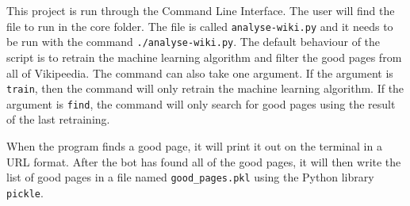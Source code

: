This project is run through the Command Line Interface. The user will find the
file to run in the core folder. The file is called \verb;analyse-wiki.py; and it
needs to be run with the command \verb;./analyse-wiki.py;. The default behaviour
of the script is to retrain the machine learning algorithm and filter the good
pages from all of Vikipeedia. The command can also take one argument. If the
argument is \verb;train;, then the command will only retrain the machine
learning algorithm. If the argument is \verb;find;, the command will only search
for good pages using the result of the last retraining. 

When the program finds a good page, it will print it out on the terminal in a
URL format. After the bot has found all of the good pages, it will then write
the list of good pages in a file named \verb;good_pages.pkl; using the Python library
\verb;pickle;.